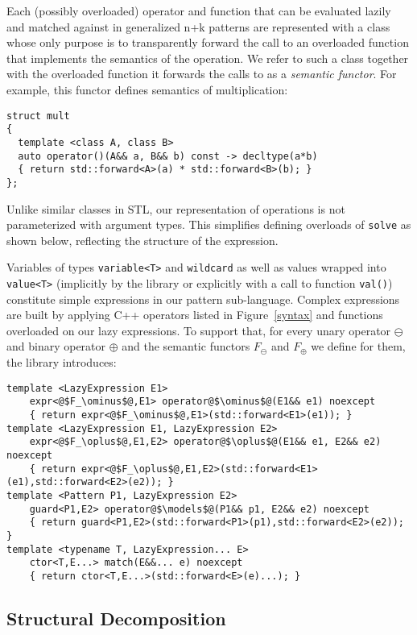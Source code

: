 \documentclass{llncs}
\makeatletter
\DeclareRobustCommand{\code}[1]{{\lstinline[keepspaces,breaklines=false,escapechar=@]{#1}}}
\makeatother
\begin{document}
Each (possibly overloaded) operator and function that can be evaluated lazily 
and matched against in generalized n+k patterns are represented with a class whose 
only purpose is to transparently forward the call to an overloaded function that 
implements the semantics of the operation. We refer to such a class together with 
the overloaded function it forwards the calls to as a \emph{semantic functor}.
For example, this functor defines semantics of multiplication:

\begin{lstlisting}[keepspaces,columns=flexible]
struct mult 
{
  template <class A, class B> 
  auto operator()(A&& a, B&& b) const -> decltype(a*b) 
  { return std::forward<A>(a) * std::forward<B>(b); }   
};
\end{lstlisting}

\noindent
Unlike similar classes in STL, our representation of operations is not 
parameterized with argument types. This simplifies defining overloads of 
\code{solve} as shown below, reflecting the structure of the 
expression.

Variables of types \code{variable<T>} and \code{wildcard} as well as values 
wrapped into \code{value<T>} (implicitly by the library or explicitly with a 
call to function \code{val()}) constitute simple expressions in our pattern 
sub-language. Complex expressions are built by applying C++ operators 
listed in Figure~\ref{syntax} and functions overloaded on our lazy expressions. 
To support that, for every unary operator $\ominus$ and binary operator $\oplus$ 
and the semantic functors $F_\ominus$ and $F_\oplus$ we define for them, the 
library introduces:

\begin{lstlisting}[keepspaces]
template <LazyExpression E1>
    expr<@$F_\ominus$@,E1> operator@$\ominus$@(E1&& e1) noexcept 
    { return expr<@$F_\ominus$@,E1>(std::forward<E1>(e1)); }
template <LazyExpression E1, LazyExpression E2>
    expr<@$F_\oplus$@,E1,E2> operator@$\oplus$@(E1&& e1, E2&& e2) noexcept 
    { return expr<@$F_\oplus$@,E1,E2>(std::forward<E1>(e1),std::forward<E2>(e2)); }
template <Pattern P1, LazyExpression E2>
    guard<P1,E2> operator@$\models$@(P1&& p1, E2&& e2) noexcept 
    { return guard<P1,E2>(std::forward<P1>(p1),std::forward<E2>(e2)); }
template <typename T, LazyExpression... E>
    ctor<T,E...> match(E&&... e) noexcept 
    { return ctor<T,E...>(std::forward<E>(e)...); }
\end{lstlisting}

\subsection{Structural Decomposition}
\label{sec:bnd}
\end{document}
